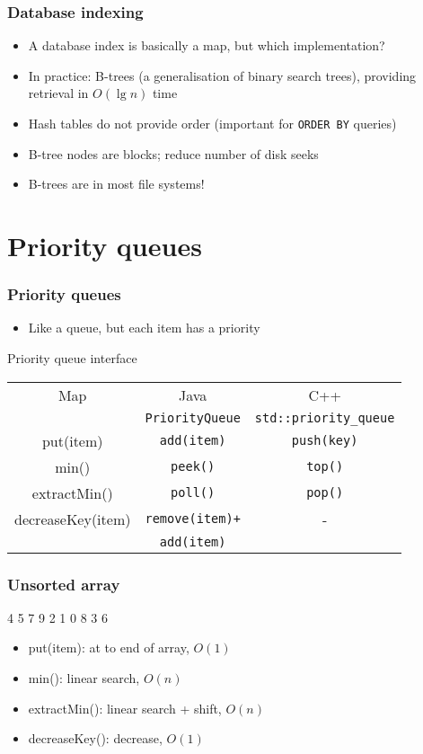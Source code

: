 \documentclass{beamer}
\begin{document}
\begin{frame}
 \frametitle{Database indexing}
 \begin{itemize}
  \item A database index is basically a map, but which implementation?
  \item In practice: B-trees (a generalisation of binary search trees),
        providing retrieval in $O(\lg n)$ time
  \item Hash tables do not provide order (important for \texttt{ORDER BY}
        queries)
  \item B-tree nodes are blocks; reduce number of disk seeks
  \item B-trees are in most file systems!
 \end{itemize}
\end{frame}

\section{Priority queues}

\begin{frame}
 \frametitle{Priority queues}
 \begin{itemize}
  \item Like a queue, but each item has a priority
 \end{itemize}
 \begin{center}
 Priority queue interface \\
 \vspace{0.5cm}
 \begin{tabular}{c|c|c}
  Map & Java & C++ \\
  & \texttt{PriorityQueue} & \texttt{std::priority\_queue} \\
  \hline
  put(item) & \texttt{add(item)} & \texttt{push(key)} \\
  min() & \texttt{peek()} & \texttt{top()} \\
  extractMin() & \texttt{poll()} & \texttt{pop()} \\
  decreaseKey(item) & \texttt{remove(item)+} & - \\
  & \texttt{add(item)} & \\
 \end{tabular}
 \end{center}
\end{frame}

\begin{frame}
 \frametitle{Unsorted array}
 \begin{center}
  4 5 7 9 2 1 0 8 3 6
 \end{center}
 \begin{itemize}
  \item put(item): at to end of array, $O(1)$
  \item min(): linear search, $O(n)$
  \item extractMin(): linear search + shift, $O(n)$
  \item decreaseKey(): decrease, $O(1)$
 \end{itemize}
\end{frame}
\end{document}
